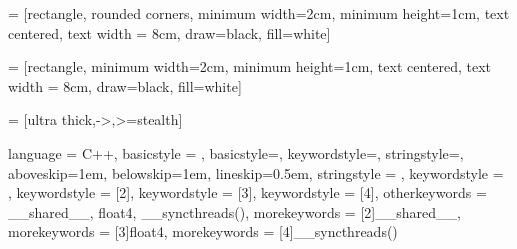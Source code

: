 \usepackage{adjustbox} %

\usepackage{mathtools} %

\usepackage{setspace}
\usepackage{indentfirst}
\usepackage{listings}
\setlength{\headheight}{25pt}%

\makeatletter
\newcommand{\gettikzxy}[3]{%
  \tikz@scan@one@point\pgfutil@firstofone#1\relax
  \edef#2{\the\pgf@x}%
  \edef#3{\the\pgf@y}%
}
\makeatother

\usepackage{tikz} %
\usetikzlibrary{positioning} %
\usetikzlibrary{calc} %
\usetikzlibrary{shapes.geometric, arrows}

 = [rectangle, rounded corners, minimum width=2cm, minimum height=1cm, text centered, text width = 8cm, draw=black, fill=white]


 = [rectangle, minimum width=2cm, minimum height=1cm, text centered, text width = 8cm, draw=black, fill=white]


 = [ultra thick,->,>=stealth]
\usepackage{xcolor}
{
    language = C++,
    basicstyle = {\ttfamily \color{main-color}},
    basicstyle=\ttfamily\small,
    keywordstyle=\color{blue}\ttfamily,
    stringstyle=\color{red}\ttfamily,
    aboveskip=1em,
    belowskip=1em,
    lineskip=0.5em,
    stringstyle = {\color{string-color}},
    keywordstyle = {\color{key-color}},
    keywordstyle = [2]{\color{green}},
    keywordstyle = [3]{\color{orange}},
    keywordstyle = [4]{\color{teal}},
    otherkeywords = {__shared__, float4, __syncthreads()},
    morekeywords = [2]{__shared__},
    morekeywords = [3]{float4},
    morekeywords = [4]{__syncthreads()}
}

